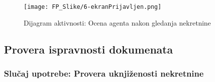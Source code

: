 \documentclass[20pt]{article}
\begin{document}
\begin{figure}[h]
        \centering
        \texttt{[image: FP\_Slike/6-ekranPrijavljen.png]}\\
        \caption{Dijagram aktivnosti: Ocena agenta nakon gledanja nekretnine}
        \label{fig:guiOcenaAgenta}
    \end{figure}
\newpage










\subsection{\bfseries \Large Provera ispravnosti dokumenata}
\setlength{\parindent}{1cm}
\fontsize{13}{18} \selectfont 
\subsubsection{\bfseries \large Slu\v{c}aj upotrebe: Provera uknji\v zenosti nekretnine}
\end{document}
